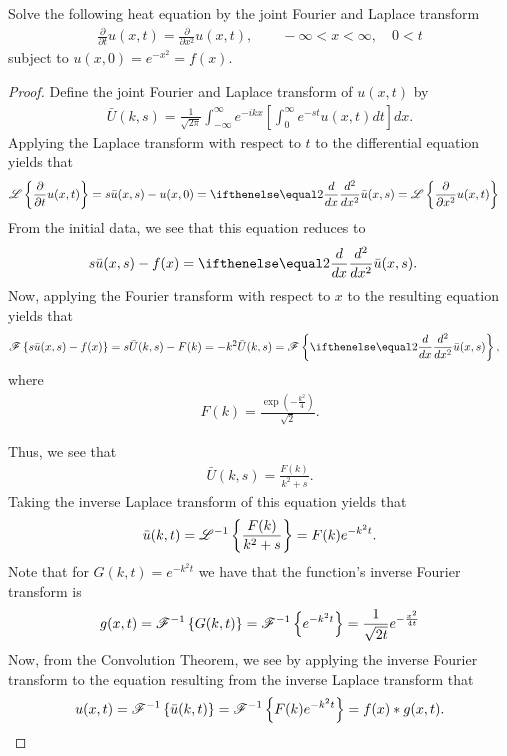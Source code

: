 \begin{problem}{8}
  Solve the following heat equation by the joint Fourier and Laplace transform
  \begin{align*}
    \frac{\partial }{\partial t}u(x, t) = \frac{\partial}{\partial x^2}u(x, t), \qquad - \infty < x <\infty, \quad 0 < t
  \end{align*}
  subject to $u(x, 0) = e^{-x^2} = f(x)$.
\end{problem}

\begin{proof}
  Define the joint  Fourier and Laplace transform of $u(x, t)$ by
  \begin{align*}
    \bar{U}(k,s) = \frac{1}{\sqrt{2\pi}}\int_{-\infty}^\infty e^{-ikx}\left[\int_0^\infty e^{-st} u(x, t)dt\right]dx.
  \end{align*}
  Applying the Laplace transform with respect to $t$ to the differential equation
  yields that
  \begin{align*}
    \laplace{\frac{\partial }{\partial t}u(x, t)} = s\bar{u}(x, s) - u(x, 0) &= \der{x}{2}\bar{u}(x,s) = \laplace{\frac{\partial}{\partial x^2}u(x, t)}
  \end{align*}
  From the initial data, we see that this equation reduces to
  \begin{align*}
    s\bar{u}(x, s) - f(x) &= \der{x}{2}\bar{u}(x,s).
  \end{align*}
  Now, applying the Fourier transform with respect to $x$ to the resulting equation yields that
  \begin{align*}
    \fourier{s\bar{u}(x, s) - f(x)} &= s\bar{U}(k, s) - F(k) =
    -k^2\bar{U}(k, s) = \fourier{\der{x}{2}\bar{u}(x,s)},
  \end{align*}
  where
  \begin{align*}
    F(k) = \frac{\exp\left(-\frac{k^2}{4}\right)}{\sqrt{2}}.
  \end{align*}

  Thus, we see that
  \begin{align*}
    \bar{U}(k, s) = \frac{F(k)}{k^2+s}.
  \end{align*}
  Taking the inverse Laplace transform of this equation yields that
  \begin{align*}
    \bar{u}(k, t) = \mathscr{L}^{-1}\left\{ {\frac{F(k)}{k^2+s}} \right\} = F(k)e^{-k^2t}.
  \end{align*}
  Note that for $G(k, t) = e^{-k^2t}$ we have that the function's inverse Fourier transform is
  \begin{align*}
    g(x, t) = \mathscr{F}^{-1}\left\{ {G(k, t)} \right\} = \mathscr{F}^{-1}\left\{ {e^{-k^2t}} \right\} = \frac{1}{\sqrt{2t}}e^{-\frac{x^2}{4t}}
  \end{align*}
  Now, from the Convolution Theorem, we see by applying the inverse Fourier transform to the equation resulting
  from the inverse Laplace transform that
  \begin{align*}
    u(x, t) = \mathscr{F}^{-1}\left\{ {\bar{u}(k, t)} \right\} = \mathscr{F}^{-1}\left\{ {F(k)e^{-k^2t}} \right\} = f(x) \ast g(x, t).
  \end{align*}


\end{proof}

